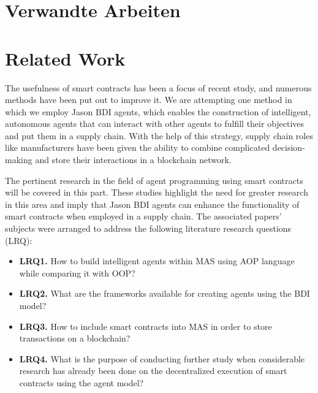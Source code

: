 {\chapter{Verwandte Arbeiten}}
{\chapter{Related Work}}
\label{sec:related}

The usefulness of smart contracts has been a focus of recent study, and numerous methods have been put out to improve it. We are attempting one method in which we employ Jason \ac{BDI} agents, which enables the construction of intelligent, autonomous agents that can interact with other agents to fulfill their objectives and put them in a supply chain. With the help of this strategy, supply chain roles like manufacturers have been given the ability to combine complicated decision-making and store their interactions in a blockchain network.

\vspace{.5cm}

The pertinent research in the field of agent programming using smart contracts will be covered in this part. These studies highlight the need for greater research in this area and imply that Jason \ac{BDI} agents can enhance the functionality of smart contracts when employed in a supply chain. The associated papers' subjects were arranged to address the following literature research questions (LRQ): 
\begin{itemize}[label={}]
    \item \textbf{LRQ1.}\label{LRQ1.} How to build intelligent agents within \ac{MAS} using \ac{AOP} language while comparing it with \ac{OOP}? \\

    \item \textbf{LRQ2.}\label{LRQ2.} What are the frameworks available for creating agents using the \ac{BDI} model?\\
    
    \item \textbf{LRQ3.}\label{LRQ3.} How to include smart contracts into \ac{MAS} in order to store transactions on a blockchain?\\

    \item \textbf{LRQ4.}\label{LRQ4.} What is the purpose of conducting further study when considerable research has already been done on the decentralized execution of smart contracts using the agent model?

\end{itemize}

